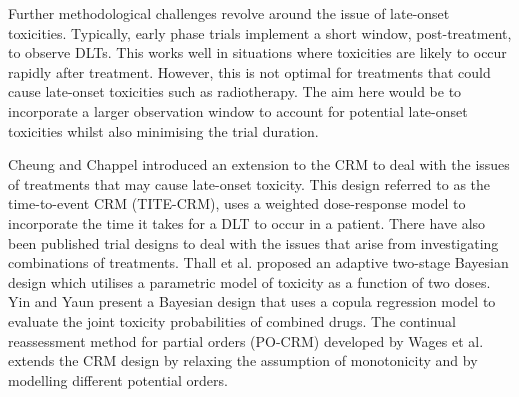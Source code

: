 Further methodological challenges revolve around the issue of late-onset toxicities. Typically, early phase trials implement a short window, post-treatment, to observe DLTs. This works well in situations where toxicities are likely to occur rapidly after treatment. However, this is not optimal for treatments that could cause late-onset toxicities such as radiotherapy. The aim here would be to incorporate a larger observation window to account for potential late-onset toxicities whilst also minimising the trial duration. 

Cheung and Chappel \cite{cheungSequentialDesignsPhase2000} introduced an extension to the CRM to deal with the issues of treatments that may cause late-onset toxicity. This design referred to as the time-to-event CRM (TITE-CRM), uses a weighted dose-response model to incorporate the time it takes for a DLT to occur in a patient. There have also been published trial designs to deal with the issues that arise from investigating combinations of treatments. Thall et al. \cite{thallDoseFindingTwoAgents2003} proposed an adaptive two-stage Bayesian design which utilises a parametric model of toxicity as a function of two doses. Yin and Yaun \cite{yinBayesianDoseFinding2009} present a Bayesian design that uses a copula regression model to evaluate the joint toxicity probabilities of combined drugs. The continual reassessment method for partial orders (PO-CRM) developed by Wages et al. \cite{wagesContinualReassessmentMethod2011} extends the CRM design by relaxing the assumption of monotonicity and by modelling different potential orders.  

